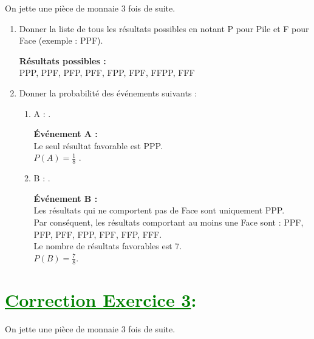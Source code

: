 \documentclass[12pt]{article}
\begin{document}
On jette une pièce de monnaie 3 fois de suite.

\begin{enumerate}
    \item Donner la liste de tous les résultats possibles en notant P pour Pile et F pour Face (exemple : PPF).
    
    \textbf{Résultats possibles :} \\
    PPP, PPF, PFP, PFF, FPP, FPF, FFPP, FFF

    \item Donner la probabilité des événements suivants :
    \begin{enumerate}
        \item A : .
        
        \textbf{Événement A :} \\
        Le seul résultat favorable est PPP. \\
         $P(A) = \frac{1}{8}$ .

        \item B : .
        
        \textbf{Événement B :} \\
        Les résultats qui ne comportent pas de Face sont uniquement PPP. \\
        Par conséquent, les résultats comportant au moins une Face sont : PPF, PFP, PFF, FPP, FPF, FFP, FFF. \\
        Le nombre de résultats favorables est 7. \\
         $P(B) = \frac{7}{8}$.
    \end{enumerate}
\end{enumerate}
\section*{\textcolor{green}{\underline{Correction Exercice 3}:}}
On jette une pièce de monnaie 3 fois de suite.
\end{document}
